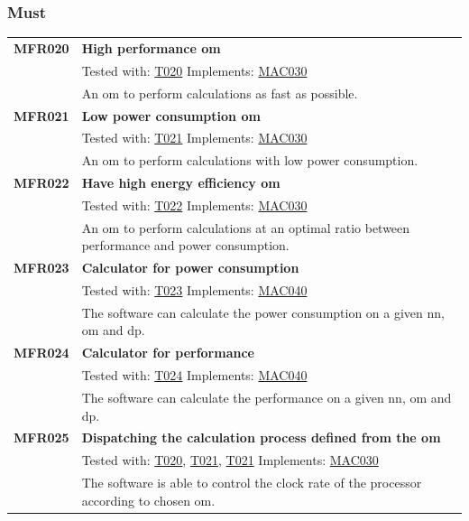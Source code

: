 \documentclass[parskip=full]{scrartcl}
\begin{document}
\subsubsection{Must}
\begin{tabular}{p{2cm}p{11.4cm}}
\textbf{MFR020} \hypertarget{MFR020} & \textbf{High \gls{performance} \gls{om}}\\         
& Tested with: \hyperlink{T020}{T020} Implements: \hyperlink{MAC030}{MAC030} \\                           
& An \gls{om} to perform calculations as fast as possible.\\
\textbf{MFR021} \hypertarget{MFR021}& \textbf{Low \gls{power consumption} \gls{om}}\\ 
& Tested with: \hyperlink{T021}{T021} Implements: \hyperlink{MAC030}{MAC030} \\                                   
& An \gls{om} to perform calculations with low \gls{power consumption}.\\
\textbf{MFR022} \hypertarget{MFR022}& \textbf{Have high energy efficiency \gls{om}}\\      
& Tested with: \hyperlink{T022}{T022}  Implements: \hyperlink{MAC030}{MAC030} \\                              
& An \gls{om} to perform calculations at an optimal ratio between \gls{performance} and \gls{power consumption}.\\
\textbf{MFR023}\hypertarget{MFR023} & \textbf{Calculator for \gls{power consumption}}\\ & Tested with: \hyperlink{T023}{T023} Implements:  \hyperlink{MAC040}{MAC040} \\                                   
& The software can calculate the \gls{power consumption} on a given \gls{nn}, \gls{om} and \gls{dp}.\\
\textbf{MFR024}\hypertarget{MFR024} & \textbf{Calculator for \gls{performance}}\\
& Tested with: \hyperlink{T024}{T024} Implements: \hyperlink{MAC040}{MAC040} \\                                    
& The software can calculate the \gls{performance} on a given \gls{nn}, \gls{om} and \gls{dp}.\\
\textbf {MFR025} \hypertarget{MFR025}& \textbf{Dispatching the calculation process defined from the \gls{om}}\\
& Tested with: \hyperlink{T020}{T020}, \hyperlink{T021}{T021}, \hyperlink{T021}{T021} Implements: \hyperlink{MAC030}{MAC030}\\
& The software is able to control the clock rate of the processor according to chosen \gls{om}. \\
\end{tabular}
\end{document}
